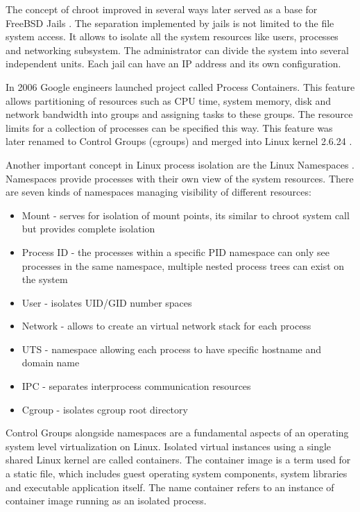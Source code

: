 \documentclass[
  digital, %
  twoside, %
  table,   %
  lof,     %
  lot,     %
]{fithesis3}
\begin{document}
The concept of chroot improved in several ways later served as a base for FreeBSD Jails \cite{freebsd_jails}. The separation implemented by jails is not limited to the file system access. It allows to isolate all the system resources like users, processes and networking subsystem. The administrator can divide the system into several independent units. Each jail can have an IP address and its own configuration.

In 2006 Google engineers launched project called Process Containers. This feature allows partitioning of resources such as CPU time, system memory, disk and network bandwidth into groups and assigning tasks to these groups. The resource limits for a collection of processes can be specified this way. This feature was later renamed to Control Groups (cgroups) and merged into Linux kernel 2.6.24 \cite{cgroups}.

Another important concept in Linux process isolation are the Linux Namespaces \cite{namespaces}. Namespaces provide processes with their own view of the system resources. There are seven kinds of namespaces managing visibility of different resources:
\begin{itemize}
  \item Mount - serves for isolation of mount points, its similar to chroot system call but provides complete isolation
  \item Process ID - the processes within a specific PID namespace can only see processes in the same namespace, multiple nested process trees can exist on the system
  \item User - isolates UID/GID number spaces
  \item Network - allows to create an virtual network stack for each process
  \item UTS - namespace allowing each process to have specific hostname and domain name
  \item IPC - separates interprocess communication resources
  \item Cgroup - isolates cgroup root directory
\end{itemize}

Control Groups alongside namespaces are a fundamental aspects of an operating system level virtualization on Linux. Isolated virtual instances using a single shared Linux kernel are called containers. The container image is a term used for a static file, which includes guest operating system components, system libraries and executable application itself. The name container refers to an instance of container image running as an isolated process.
\end{document}
